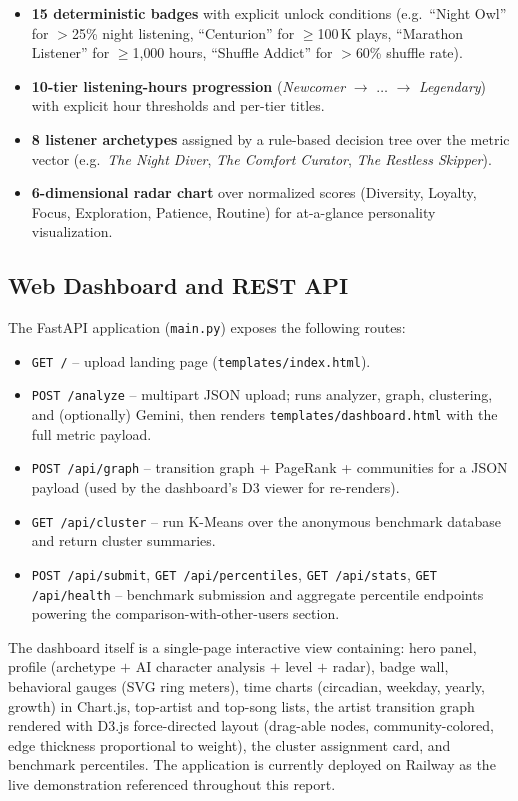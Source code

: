 \documentclass[conference]{IEEEtran}
\begin{document}
\begin{itemize}
    \item \textbf{15 deterministic badges} with explicit unlock conditions (e.g.\ ``Night Owl'' for $>$25\% night listening, ``Centurion'' for $\geq$100\,K plays, ``Marathon Listener'' for $\geq$1{,}000 hours, ``Shuffle Addict'' for $>$60\% shuffle rate).
    \item \textbf{10-tier listening-hours progression} (\textit{Newcomer} $\rightarrow$ $\dots$ $\rightarrow$ \textit{Legendary}) with explicit hour thresholds and per-tier titles.
    \item \textbf{8 listener archetypes} assigned by a rule-based decision tree over the metric vector (e.g.\ \textit{The Night Diver}, \textit{The Comfort Curator}, \textit{The Restless Skipper}).
    \item \textbf{6-dimensional radar chart} over normalized scores (Diversity, Loyalty, Focus, Exploration, Patience, Routine) for at-a-glance personality visualization.
\end{itemize}

\subsection{Web Dashboard and REST API}

The FastAPI application (\texttt{main.py}) exposes the following routes:

\begin{itemize}
    \item \texttt{GET /} -- upload landing page (\texttt{templates/index.html}).
    \item \texttt{POST /analyze} -- multipart JSON upload; runs analyzer, graph, clustering, and (optionally) Gemini, then renders \texttt{templates/dashboard.html} with the full metric payload.
    \item \texttt{POST /api/graph} -- transition graph + PageRank + communities for a JSON payload (used by the dashboard's D3 viewer for re-renders).
    \item \texttt{GET /api/cluster} -- run K-Means over the anonymous benchmark database and return cluster summaries.
    \item \texttt{POST /api/submit}, \texttt{GET /api/percentiles}, \texttt{GET /api/stats}, \texttt{GET /api/health} -- benchmark submission and aggregate percentile endpoints powering the comparison-with-other-users section.
\end{itemize}

The dashboard itself is a single-page interactive view containing: hero panel, profile (archetype $+$ AI character analysis $+$ level $+$ radar), badge wall, behavioral gauges (SVG ring meters), time charts (circadian, weekday, yearly, growth) in Chart.js, top-artist and top-song lists, the artist transition graph rendered with D3.js force-directed layout (drag-able nodes, community-colored, edge thickness proportional to weight), the cluster assignment card, and benchmark percentiles. The application is currently deployed on Railway as the live demonstration referenced throughout this report.
\end{document}
